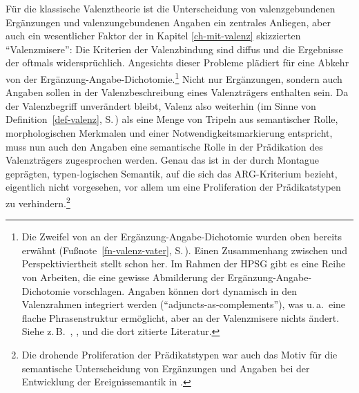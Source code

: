 Für die klassische Valenztheorie ist die Unterscheidung von valenzgebundenen Ergänzungen und valenzungebundenen Angaben ein zentrales Anliegen, aber auch ein wesentlicher Faktor der in Kapitel \ref{ch-mit-valenz} skizzierten "`Valenzmisere"': Die Kriterien der Valenzbindung sind diffus und die Ergebnisse der  oftmals widersprüchlich. Angesichts dieser Probleme plädiert \cite{Storrer:92} für eine Abkehr von der Ergänzung-Angabe-Dichotomie.\footnote{Die Zweifel von \cite{Vater:78} an der Ergänzung-Angabe-Dichotomie wurden oben bereits erwähnt (Fußnote~\ref{fn-valenz-vater}, S.\,\pageref{fn-valenz-vater}). Einen Zusammenhang zwischen  und Perspektiviertheit stellt schon \cite{Heringer:84} her. Im Rahmen der HPSG gibt es eine Reihe von Arbeiten, die eine gewisse Abmilderung der Ergänzung-Angabe-Dichotomie vorschlagen. Angaben können dort dynamisch in den Valenzrahmen integriert werden ("`adjuncts-as-complements"'), was u.\,a.\ eine flache Phrasenstruktur ermöglicht, aber an der Valenzmisere nichts ändert. Siehe z.\,B.\ \citet[Kapitel~9]{Przepiorkowski:99}, \cite{Bouma:etal:01}, \cite{Bouma:03} und die dort zitierte Literatur.} Nicht nur Ergänzungen, sondern auch Angaben sollen in der Valenzbeschreibung eines Valenzträgers enthalten sein. Da der Valenzbegriff unverändert bleibt, Valenz also weiterhin (im Sinne von Definition~\ref{def-valenz}, S.\,\pageref{def-valenz}) als eine Menge von Tripeln aus semantischer Rolle, morphologischen Merkmalen und einer Notwendigkeitsmarkierung entspricht, muss nun auch den Angaben eine semantische Rolle in der Prädikation des Valenzträgers zugesprochen werden. Genau das ist in der durch Montague geprägten, typen-logischen Semantik, auf die sich das ARG-Kriterium bezieht, eigentlich nicht vorgesehen, vor allem um eine Proliferation der Prädikatstypen zu verhindern.\footnote{Die drohende Proliferation der Prädikatstypen war auch das Motiv für die semantische Unterscheidung von Ergänzungen und Angaben bei der Entwicklung der Ereignissemantik in \cite{Davidson:67}.} 

